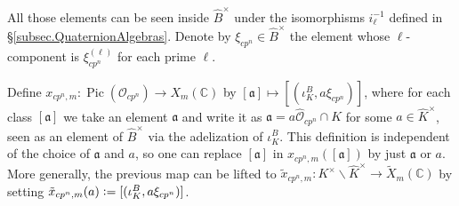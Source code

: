 \documentclass[a4paper]{amsart}
\numberwithin{equation}{section}
\theoremstyle{definition}
\newcommand{\C}{\mathbb{C}}
\newcommand{\defeq}{\vcentcolon=}
\DeclareMathOperator{\Pic}{Pic}
\begin{document}
All those elements can be seen inside $\widehat{B}^\times$ under the isomorphisms $i_\ell^{-1}$ defined in \S\ref{subsec.QuaternionAlgebras}. Denote by $\xi_{cp^n}\in \widehat{B}^\times$ the element whose $\ell$-component is $\xi_{cp^n}^{(\ell)}$ for each prime $\ell$.

Define $x_{cp^n,m}\colon\Pic(\mathcal{O}_{cp^n})\rightarrow {X}_m(\C)$ by $[\mathfrak{a}]\mapsto[(\iota_K^B,a\xi_{cp^n})]$, where
for each class $[\mathfrak{a}]$ we take an element $\mathfrak{a}$ and write it as $\mathfrak{a}=a\widehat{\mathcal{O}}_{cp^n}\cap K$ for some $a\in \widehat{K}^\times$, seen as an element of $\widehat{B}^\times$ via the adelization of $\iota_K^B$. This definition is independent of the choice of $\mathfrak{a}$ and $a$, so one can replace $[\mathfrak{a}]$ in $x_{cp^n,m}([\mathfrak{a}])$ by just $\mathfrak{a}$ or $a$. More generally, the previous map can be lifted to
$\tilde{x}_{cp^n,m}\colon K^\times\backslash\widehat{K}^\times\rightarrow \widetilde{X}_m(\C)$ by setting $\tilde{x}_{cp^n,m}(a)\defeq[(\iota_K^B,a\xi_{cp^n})]$.
\end{document}
